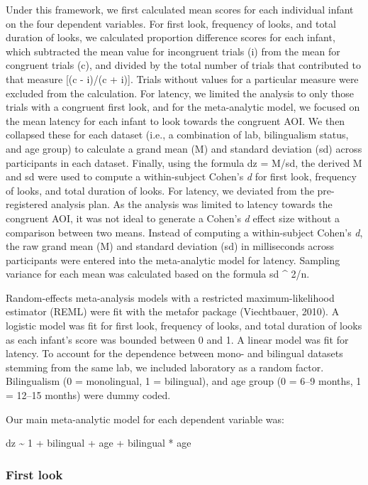 \documentclass[,man,floatsintext]{apa6}
\begin{document}
Under this framework, we first calculated mean scores for each individual infant on the four dependent variables. For first look, frequency of looks, and total duration of looks, we calculated proportion difference scores for each infant, which subtracted the mean value for incongruent trials (i) from the mean for congruent trials (c), and divided by the total number of trials that contributed to that measure {[}(c - i)/(c + i){]}. Trials without values for a particular measure were excluded from the calculation. For latency, we limited the analysis to only those trials with a congruent first look, and for the meta-analytic model, we focused on the mean latency for each infant to look towards the congruent AOI. We then collapsed these for each dataset (i.e., a combination of lab, bilingualism status, and age group) to calculate a grand mean (M) and standard deviation (sd) across participants in each dataset. Finally, using the formula dz = M/sd, the derived M and sd were used to compute a within-subject Cohen's \emph{d} for first look, frequency of looks, and total duration of looks. For latency, we deviated from the pre-registered analysis plan. As the analysis was limited to latency towards the congruent AOI, it was not ideal to generate a Cohen's \emph{d} effect size without a comparison between two means. Instead of computing a within-subject Cohen's \emph{d}, the raw grand mean (M) and standard deviation (sd) in milliseconds across participants were entered into the meta-analytic model for latency. Sampling variance for each mean was calculated based on the formula sd \^{} 2/n.

Random-effects meta-analysis models with a restricted maximum-likelihood estimator (REML) were fit with the metafor package (Viechtbauer, 2010). A logistic model was fit for first look, frequency of looks, and total duration of looks as each infant's score was bounded between 0 and 1. A linear model was fit for latency. To account for the dependence between mono- and bilingual datasets stemming from the same lab, we included laboratory as a random factor. Bilingualism (0 = monolingual, 1 = bilingual), and age group (0 = 6--9 months, 1 = 12--15 months) were dummy coded.

Our main meta-analytic model for each dependent variable was:

dz \textasciitilde{} 1 + bilingual + age + bilingual * age

\hypertarget{first-look-1}{%
\subsubsection{First look}\label{first-look-1}}
\end{document}
